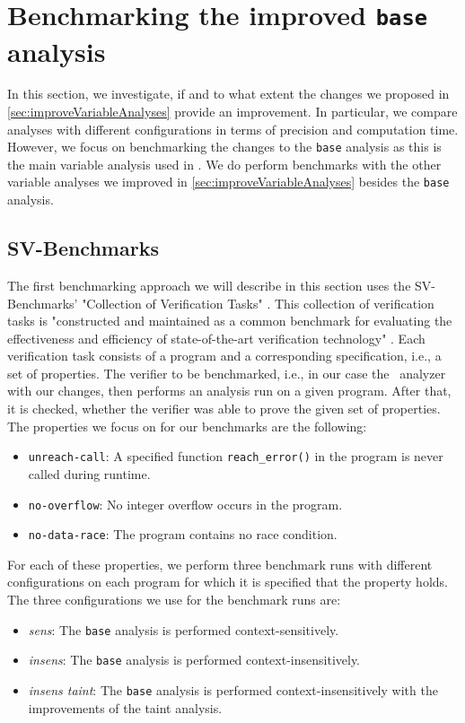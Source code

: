   \section{Benchmarking the improved \texttt{base} analysis}
    In this section, we investigate, if and to what extent the changes we proposed in \autoref{sec:improveVariableAnalyses} provide an improvement. In particular, we compare analyses with different configurations in terms of precision and computation time. However, we focus on benchmarking the changes to the \texttt{base} analysis as this is the main variable analysis used in \gob. We do perform benchmarks with the other variable analyses we improved in \autoref{sec:improveVariableAnalyses} besides the \texttt{base} analysis.
    \subsection{SV-Benchmarks}\label{sec:benchSVbench}
      The first benchmarking approach we will describe in this section uses the SV-Benchmarks' "Collection of Verification Tasks" \parencite{svBench}. This collection of verification tasks is "constructed and maintained as a common benchmark for evaluating the effectiveness and efficiency of state-of-the-art verification technology" \parencite{svBench}. Each verification task consists of a program and a corresponding specification, i.e., a set of properties. The verifier to be benchmarked, i.e., in our case the \gob\ analyzer with our changes, then performs an analysis run on a given program. After that, it is checked, whether the verifier was able to prove the given set of properties. The properties we focus on for our benchmarks are the following:
      \begin{itemize}
        \item \texttt{unreach-call}: A specified function \texttt{reach\_error()} in the program is never called during runtime.
        \item \texttt{no-overflow}: No integer overflow occurs in the program.
        \item \texttt{no-data-race}: The program contains no race condition.
      \end{itemize}
      For each of these properties, we perform three benchmark runs with different configurations on each program for which it is specified that the property holds.
      The three configurations we use for the benchmark runs are:
      \begin{itemize}
        \item \textit{sens}: The \texttt{base} analysis is performed context-sensitively.
        \item \textit{insens}: The \texttt{base} analysis is performed context-insensitively.
        \item \textit{insens taint}: The \texttt{base} analysis is performed context-insensitively with the improvements of the taint analysis.
      \end{itemize}
